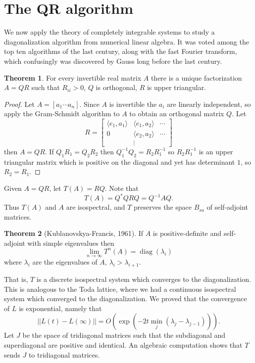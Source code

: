 \documentclass[12pt]{report}
\newcommand{\diag}{\operatorname{diag}}
\theoremstyle{definition}
\newtheorem{theorem}{Theorem}[chapter]
\begin{document}
\section{The QR algorithm}
We now apply the theory of completely integrable systems to study a diagonalization algorithm from numerical linear algebra.
It was voted among the top ten algorithms of the last century, along with the fast Fourier transform, which confusingly was discovered by Gauss long before the last century.
\begin{theorem}
For every invertible real matrix $A$ there is a unique factorization $A = QR$ such that $R_{ii} > 0$, $Q$ is orthogonal, $R$ is upper triangular.
\end{theorem}
\begin{proof}
Let $A = [a_1 \cdots a_n]$. Since $A$ is invertible the $a_i$ are linearly independent, so apply the Gram-Schmidt algorithm to $A$ to obtain an orthogonal matrix $Q$. Let
$$R = \begin{bmatrix}
\langle e_1, a_1\rangle & \langle e_1, a_2 \rangle & \cdots \\
0 & \langle e_2, a_2 \rangle & \cdots\\
&\vdots
\end{bmatrix}$$
then $A = QR$. If $Q_1R_1 = Q_2R_2$ then $Q_1^{-1}Q_2 = R_2 R_1^{-1}$ so $R_2R_1^{-1}$ is an upper triangular matrix which is positive on the diagonal and yet has determinant $1$, so $R_2 = R_1$.
\end{proof}
Given $A = QR$, let $T(A) = RQ$. Note that
$$T(A) = Q^*QRQ = Q^{-1}AQ.$$
Thus $T(A)$ and $A$ are isospectral, and $T$ preserves the space $B_{sa}$ of self-adjoint matrices.
\begin{theorem}[Kublanovskya-Francis, 1961]
If $A$ is positive-definite and self-adjoint with simple eigenvalues then
$$\lim_{n \to \infty} T^n(A) = \diag(\lambda_i)$$
where $\lambda_i$ are the eigenvalues of $A$, $\lambda_i > \lambda_{i+1}$.
\end{theorem}
That is, $T$ is a discrete isospectral system which converges to the diagonalization. This is analogous to the Toda lattice, where we had a continuous isospectral system which converged to the diagonalization.
We proved that the convergence of $L$ is exponential, namely that
$$||L(t) - L(\infty)|| = O(\exp(-2t\min_j(\lambda_j - \lambda_{j-1}))).$$
Let $J$ be the space of tridiagonal matrices such that the subdiagonal and superdiagonal are positive and identical. An algebraic computation shows that $T$ sends $J$ to tridiagonal matrices.
\end{document}
